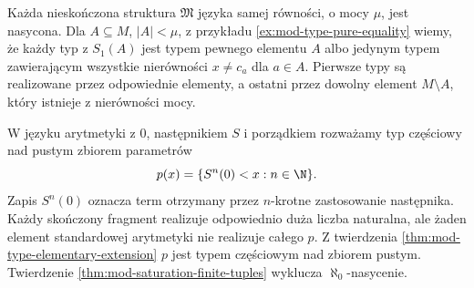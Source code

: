 \begin{przyklad}
\label{ex:mod-saturation-equality}
Każda nieskończona struktura $\mathfrak M$ języka samej
równości, o mocy $\mu$, jest nasycona. Dla $A\subseteq M$,
$|A|<\mu$, z przykładu \ref{ex:mod-type-pure-equality}
wiemy, że każdy typ z $S_1(A)$ jest typem pewnego
elementu $A$ albo jedynym typem zawierającym wszystkie
nierówności $x\ne c_a$ dla $a\in A$.
Pierwsze typy są realizowane przez odpowiednie elementy,
a ostatni przez dowolny element $M\setminus A$,
który istnieje z nierówności mocy.
\end{przyklad}

\begin{przyklad}
\label{ex:mod-saturation-arithmetic}
W języku arytmetyki z $0$, następnikiem $S$ i porządkiem
rozważamy typ częściowy nad pustym zbiorem parametrów
\[
p(x)=\{S^n(0)<x:n\in\N\}.
\]
Zapis $S^n(0)$ oznacza term otrzymany przez $n$-krotne
zastosowanie następnika. Każdy skończony fragment
realizuje odpowiednio duża liczba naturalna, ale żaden
element standardowej arytmetyki nie realizuje całego $p$.
Z twierdzenia \ref{thm:mod-type-elementary-extension}
$p$ jest typem częściowym nad zbiorem pustym.
Twierdzenie \ref{thm:mod-saturation-finite-tuples}
wyklucza $\aleph_0$-nasycenie.
\end{przyklad}

